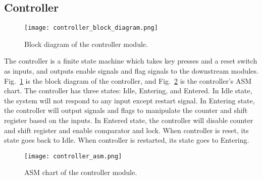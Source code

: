 \subsection{Controller}

\begin{figure}[htbp]
   \centering
   \texttt{[image: controller\_block\_diagram.png]}
   \caption{Block diagram of the controller module.}
   \label{fig:controller_block_diagram}
\end{figure}

The controller is a finite state machine which takes key presses and a reset switch as inputs, and outputs enable signals and flag signals to the downstream modules. Fig.~\ref{fig:controller_block_diagram} is the block diagram of the controller, and Fig.~\ref{fig:controller_asm} is the controller's ASM chart. The controller has three states: Idle, Entering, and Entered. In Idle state, the system will not respond to any input except restart signal. In Entering state, the controller will output signals and flags to manipulate the counter and shift register based on the inputs. In Entered state, the controller will disable counter and shift register and enable comparator and lock. When controller is reset, its state goes back to Idle. When controller is restarted, its state goes to Entering.

\begin{figure}[htbp]
   \centering
   \texttt{[image: controller\_asm.png]}
   \caption{ASM chart of the controller module.}
   \label{fig:controller_asm}
\end{figure}

